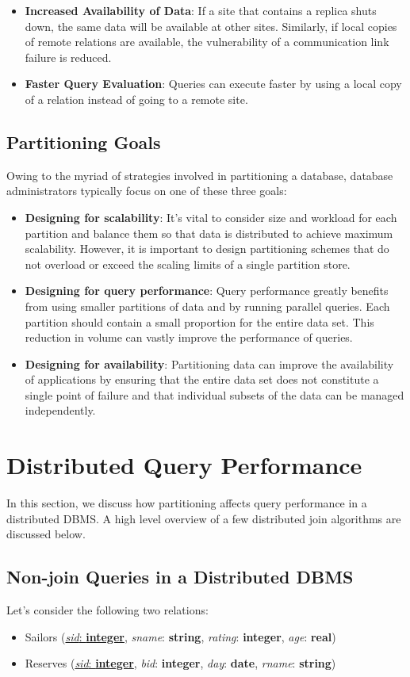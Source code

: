 \begin{itemize}
    \item \textbf{Increased Availability of Data}: If a site that contains a replica shuts down, the same data will be available at other sites. Similarly, if local copies of remote relations are available, the vulnerability of a communication link failure is reduced.
    \item \textbf{Faster Query Evaluation}: Queries can execute faster by using a local copy of a relation instead of going to a remote site.
\end{itemize}

\subsection{Partitioning Goals}
Owing to the myriad of strategies involved in partitioning a database, database administrators typically focus on one of these three goals:

\begin{itemize}
    \item \textbf{Designing for scalability}: It's vital to consider size and workload for each partition and balance them so that data is distributed to achieve maximum scalability. However, it is important to design partitioning schemes that do not overload or exceed the scaling limits of a single partition store. 
    \item \textbf{Designing for query performance}: Query performance greatly benefits from using smaller partitions of data and by running parallel queries. Each partition should contain a small proportion for the entire data set. This reduction in volume can vastly improve the performance of queries.
    \item \textbf{Designing for availability}: Partitioning data can improve the availability of applications by ensuring that the entire data set does not constitute a single point of failure and that individual subsets of the data can be managed independently. 
\end{itemize}

\section{Distributed Query Performance}
In this section, we discuss how partitioning affects query performance in a distributed DBMS. A high level overview of a few distributed join algorithms are discussed below. 

\subsection{Non-join Queries in a Distributed DBMS}
Let's consider the following two relations:
\begin{itemize}
    \item Sailors (\underline{\textit{sid}: \textbf{integer}}, \textit{sname}: \textbf{string}, \textit{rating}: \textbf{integer}, \textit{age}: \textbf{real})
    \item Reserves (\underline{\textit{sid}: \textbf{integer}}, \textit{bid}: \textbf{integer}, \textit{day}: \textbf{date}, \textit{rname}: \textbf{string})
\end{itemize}

